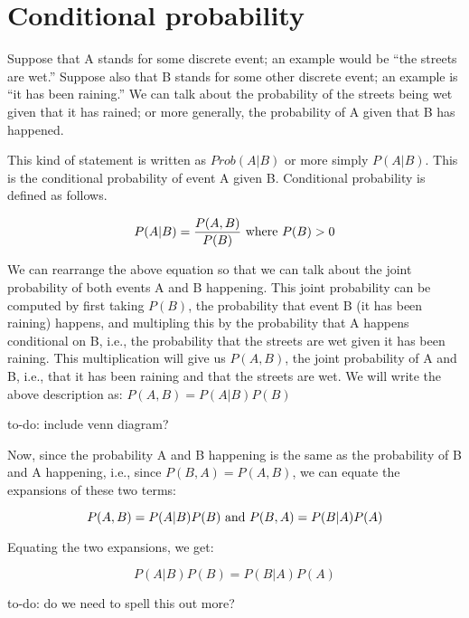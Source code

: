\documentclass[12pt,]{krantz}
\let\BeginKnitrBlock\begin \let\EndKnitrBlock\end
\begin{document}
\hypertarget{conditional-probability}{%
\section{Conditional probability}\label{conditional-probability}}

Suppose that A stands for some discrete event; an example would be ``the streets are wet.'' Suppose also that B stands for some other discrete event; an example is ``it has been raining.'' We can talk about the probability of the streets being wet given that it has rained; or more generally, the probability of A given that B has happened.

This kind of statement is written as \(Prob(A|B)\) or more simply \(P(A|B)\). This is the conditional probability of event A given B. Conditional probability is defined as follows.

\begin{equation} 
P(A|B)= \frac{P(A,B)}{P(B)} \hbox{ where } P(B)>0
\end{equation}

We can rearrange the above equation so that we can talk about the joint probability of both events A and B happening. This joint probability can be computed by first taking \(P(B)\), the probability that event B (it has been raining) happens, and multipling this by the probability that A happens conditional on B, i.e., the probability that the streets are wet given it has been raining. This multiplication will give us \(P(A,B)\), the joint probability of A and B, i.e., that it has been raining and that the streets are wet. We will write the above description as: \(P(A,B)=P(A|B)P(B)\)

\BeginKnitrBlock{rmdnote}
to-do: include venn diagram?
\EndKnitrBlock{rmdnote}

Now, since the probability A and B happening is the same as the probability of B and A happening, i.e., since \(P(B,A)=P(A,B)\), we can equate the expansions of these two terms:

\begin{equation}
P(A,B) = P(A|B) P(B) \hbox{ and } P(B,A) = P(B|A)P(A) 
\end{equation}

Equating the two expansions, we get:

\begin{equation}
P(A|B) P(B) = P(B|A)P(A) 
\end{equation}

\BeginKnitrBlock{rmdnote}
to-do: do we need to spell this out more?
\EndKnitrBlock{rmdnote}
\end{document}
